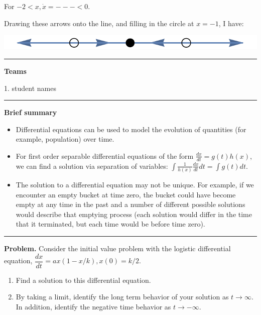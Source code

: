 \documentclass[12pt,letterpaper,noanswers]{exam}
\begin{document}
For $-2 < x, \dot x = - - - < 0$.

Drawing these arrows onto the line, and filling in the circle at $x = -1$, I have:

\includegraphics{img/C34skillex.pdf}

\vspace{0.2cm}
\hrule
\vspace{0.2cm}

\noindent\textbf{Teams}

\begin{multicols}{2}

1.  student names
\end{multicols}


\vspace{0.2cm}
\hrule
\vspace{0.2cm}


\noindent\textbf{Brief summary}
\begin{tcolorbox}
\begin{itemize}
\itemsep0em
    \item Differential equations can be used to model the evolution of quantities (for example, population) over time.
    \item For first order separable differential equations of the form $\frac{dx}{dt} = g(t)h(x)$, we can find a solution via separation of variables: $\displaystyle\int \frac{1}{h(x)} \frac{dx}{dt} dt = \int g(t) dt$.
    \item The solution to a differential equation may not be unique.  For example, if we encounter an empty bucket at time zero, the bucket could have become empty at any time in the past and a number of different possible solutions would describe that emptying process (each solution would differ in the time that it terminated, but each time would be before time zero).
\end{itemize}
\end{tcolorbox}

\vspace{0.2cm}
\hrule
\vspace{0.2cm}


\noindent\textbf{Problem.}  Consider the initial value problem with the logistic differential equation, $\dfrac{dx}{dt} = ax(1-x/k), x(0) = k/2$.
\begin{enumerate}
    \item Find a solution to this differential equation.
    \vspace{2.5in}
    
    \item By taking a limit, identify the long term behavior of your solution as $t\rightarrow \infty$.  In addition, identify the negative time behavior as $t\rightarrow -\infty$.
\end{enumerate}
\end{document}

